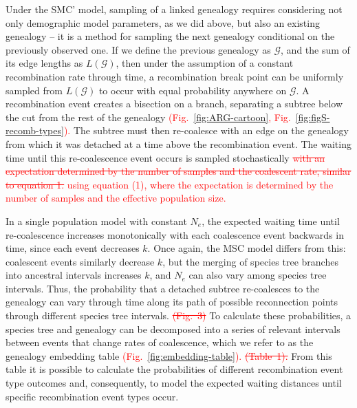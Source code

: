 \documentclass[11pt]{article}
\begin{document}
Under the SMC' model, sampling of a linked genealogy requires considering not only 
demographic model parameters, 
as we did above, but also an existing genealogy -- it is a method 
for sampling the next genealogy conditional on the previously observed one. 
If we define the previous genealogy as $\mathcal{G}$, and the sum of its edge lengths 
as $L(\mathcal{G})$, then under the assumption of a constant recombination rate through time,
a recombination break point can be uniformly sampled from $L(\mathcal{G})$ to occur with 
equal probability anywhere on $\mathcal{G}$. 
A recombination event creates a bisection on a branch, separating a subtree 
below the cut from the rest of the genealogy 
\textcolor{red}{
(Fig.~\ref{fig:ARG-cartoon}, Fig.~\ref{fig:figS-recomb-types}).
}
The subtree must then re-coalesce 
with an edge on the genealogy from which it was detached at a time
above the recombination event.
The waiting time until 
this re-coalescence event occurs is sampled stochastically 
\textcolor{red}{
\sout{with an expectation determined by the number of samples and
the coalescent rate, similar to equation 1.
}
using equation (1), where the expectation is determined by the 
number of samples and the effective population size.
} %

In a single population model with constant $N_e$, the expected waiting time until 
re-coalescence increases monotonically with each coalescence event 
backwards in time, since each event decreases $k$.
Once again, the MSC model differs from this: 
coalescent events similarly decrease $k$, but the merging of 
species tree branches into ancestral intervals increases $k$, and $N_e$ 
can also vary among species tree intervals. 
Thus, the probability that a detached subtree re-coalesces to the genealogy 
can vary through time along its path of possible reconnection points through 
different species tree intervals.
% 
\textcolor{red}{\sout{(Fig.~3)}}
% 
To calculate these probabilities, a species tree and genealogy can be decomposed into a 
series of relevant intervals between events that change rates of coalescence,
which we refer to as the genealogy embedding table 
\textcolor{red}{
(Fig.~\ref{fig:embedding-table}).
\sout{(Table~1).}
}
% 
From this table it is possible to calculate the probabilities of different
recombination event type outcomes and, consequently, to model the expected 
waiting distances until specific recombination event types occur. 
\end{document}
